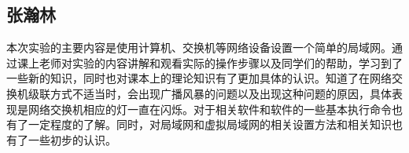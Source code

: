 \subsection{张瀚林}
本次实验的主要内容是使用计算机、交换机等网络设备设置一个简单的局域网。通过课上老师对实验的内容讲解和观看实际的操作步骤以及同学们的帮助，学习到了一些新的知识，同时也对课本上的理论知识有了更加具体的认识。知道了在网络交换机级联方式不适当时，会出现广播风暴的问题以及出现这种问题的原因，具体表现是网络交换机相应的灯一直在闪烁。对于相关软件和软件的一些基本执行命令也有了一定程度的了解。同时，对局域网和虚拟局域网的相关设置方法和相关知识也有了一些初步的认识。
